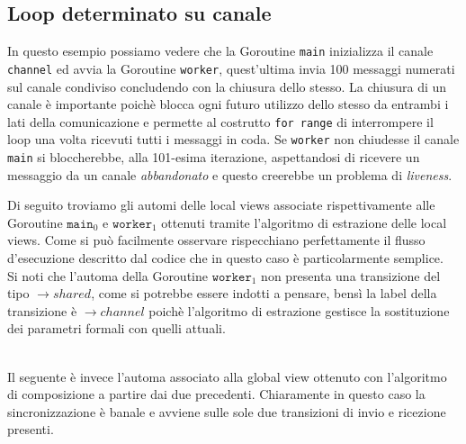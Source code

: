 \subsection{Loop determinato su canale}
In questo esempio possiamo vedere che la Goroutine \texttt{main} inizializza il canale \texttt{channel} ed avvia la Goroutine \texttt{worker}, quest'ultima invia 100 messaggi numerati sul canale condiviso concludendo con la chiusura dello stesso. La chiusura di un canale è importante poichè blocca ogni futuro utilizzo dello stesso da entrambi i lati della comunicazione e permette al costrutto \texttt{for range} di interrompere il loop una volta ricevuti tutti i messaggi in coda. Se \texttt{worker} non chiudesse il canale \texttt{main} si bloccherebbe, alla 101-esima iterazione, aspettandosi di ricevere un messaggio da un canale \emph{abbandonato} e questo creerebbe un problema di \emph{liveness}.
\newpage %

\bigskip
Di seguito troviamo gli automi delle local views associate rispettivamente alle Goroutine $\texttt{main}_0$ e $\texttt{worker}_1$ ottenuti tramite l'algoritmo di estrazione delle local views. Come si può facilmente osservare rispecchiano perfettamente il flusso d'esecuzione descritto dal codice che in questo caso è particolarmente semplice.\\
Si noti che l'automa della Goroutine $\texttt{worker}_1$ non presenta una transizione del tipo $\rightarrow shared$, come si potrebbe essere indotti a pensare, bensì la label della transizione è $  \rightarrow channel$ poichè l'algoritmo di estrazione gestisce la sostituzione dei parametri formali con quelli attuali.
\begin{figure}[h!]
    \centering
\end{figure} \bigskip \\
Il seguente è invece l'automa associato alla global view ottenuto con l'algoritmo di composizione a partire dai due precedenti. Chiaramente in questo caso la sincronizzazione è banale e avviene sulle sole due transizioni di invio e ricezione presenti.

